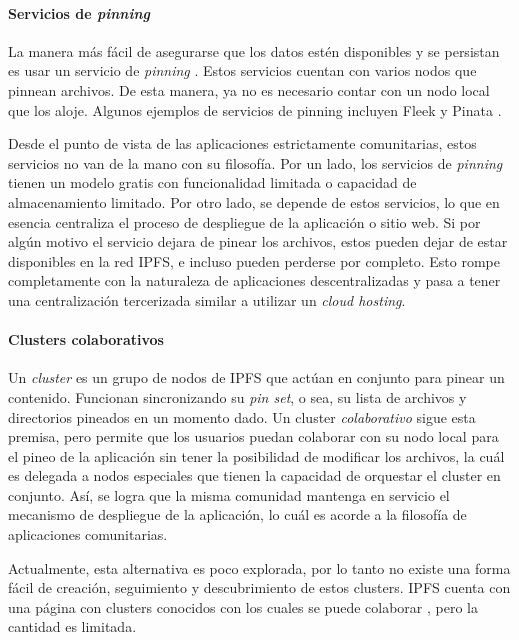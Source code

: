 \paragraph{Servicios de \textit{pinning}}

La manera más fácil de asegurarse que los datos estén disponibles y se persistan es usar un servicio de \textit{pinning} \cite{pinning-services}. Estos servicios cuentan con varios nodos que pinnean archivos. De esta manera, ya no es necesario contar con un nodo local que los aloje. Algunos ejemplos de servicios de pinning incluyen Fleek \cite{fleek} y Pinata \cite{pinata}.

Desde el punto de vista de las aplicaciones estrictamente comunitarias, estos servicios no van de la mano con su filosofía. Por un lado, los servicios de \textit{pinning} tienen un modelo gratis con funcionalidad limitada o capacidad de almacenamiento limitado. Por otro lado, se depende de estos servicios, lo que en esencia centraliza el proceso de despliegue de la aplicación o sitio web. Si por algún motivo el servicio dejara de pinear los archivos, estos pueden dejar de estar disponibles en la red IPFS, e incluso pueden perderse por completo. Esto rompe completamente con la naturaleza de aplicaciones descentralizadas y pasa a tener una centralización tercerizada similar a utilizar un \textit{cloud hosting}.

\paragraph{Clusters colaborativos}

Un \textit{cluster} es un grupo de nodos de IPFS que actúan en conjunto para pinear un contenido. Funcionan sincronizando su \textit{pin set}, o sea, su lista de archivos y directorios pineados en un momento dado. Un cluster \textit{colaborativo} sigue esta premisa, pero permite que los usuarios puedan colaborar con su nodo local para el pineo de la aplicación sin tener la posibilidad de modificar los archivos, la cuál es delegada a nodos especiales que tienen la capacidad de orquestar el cluster en conjunto. Así, se logra que la misma comunidad mantenga en servicio el mecanismo de despliegue de la aplicación, lo cuál es acorde a la filosofía de aplicaciones comunitarias.

Actualmente, esta alternativa es poco explorada, por lo tanto no existe una forma fácil de creación, seguimiento y descubrimiento de estos clusters. IPFS cuenta con una página con clusters conocidos con los cuales se puede colaborar \cite{collaborative-clusters}, pero la cantidad es limitada.

